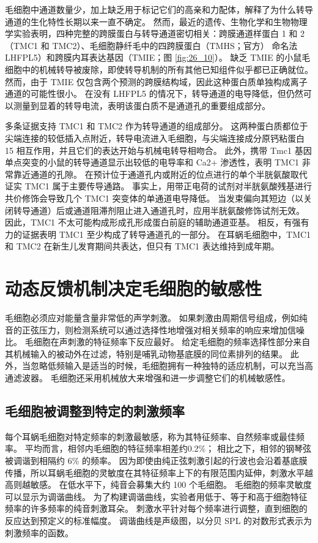 毛细胞中通道数量少，加上缺乏用于标记它们的高亲和力配体，解释了为什么转导通道的生化特性长期以来一直不确定。 
然而，最近的遗传、生物化学和生物物理学实验表明，四种完整的跨膜蛋白与转导通道密切相关：跨膜通道样蛋白 1 和 2（TMC1 和 TMC2）、毛细胞静纤毛中的四跨膜蛋白（TMHS；官方） 命名法 LHFPL5）和跨膜内耳表达基因（TMIE；图 \ref{fig:26_10}）。 
缺乏 TMIE 的小鼠毛细胞中的机械转导被废除，即使转导机制的所有其他已知组件似乎都已正确就位。 
然而，由于 TMIE 仅包含两个预测的跨膜结构域，因此这种蛋白质单独构成离子通道的可能性很小。 
在没有 LHFPL5 的情况下，转导通道的电导降低，但仍然可以测量到显着的转导电流，表明该蛋白质不是通道孔的重要组成部分。


多条证据支持 TMC1 和 TMC2 作为转导通道的组成部分。 
这两种蛋白质都位于尖端连接的较低插入点附近，转导电流进入毛细胞，与尖端连接成分原钙粘蛋白 15 相互作用，并且它们的表达开始与机械电转导相吻合。 
此外，携带 Tmc1 基因单点突变的小鼠的转导通道显示出较低的电导率和 Ca2+ 渗透性，表明 TMC1 非常靠近通道的孔隙。 
在预计位于通道孔内或附近的位点进行的单个半胱氨酸取代证实 TMC1 属于主要传导通路。 
事实上，用带正电荷的试剂对半胱氨酸残基进行共价修饰会导致几个 TMC1 突变体的单通道电导降低。 
当发束偏向其短边（以关闭转导通道）后或通道阻滞剂阻止进入通道孔时，应用半胱氨酸修饰试剂无效。 
因此，TMC1 不太可能构成形成孔形成蛋白前庭的辅助通道亚基。 
相反，有强有力的证据表明 TMC1 至少构成了转导通道孔的一部分。 
在耳蜗毛细胞中，TMC1 和 TMC2 在新生儿发育期间共表达，但只有 TMC1 表达维持到成年期。


\section{动态反馈机制决定毛细胞的敏感性}

毛细胞必须应对能量含量非常低的声学刺激。
如果刺激由周期信号组成，例如纯音的正弦压力，则检测系统可以通过选择性地增强对相关频率的响应来增加信噪比。
毛细胞在声刺激的特征频率下反应最好。 给定毛细胞的频率选择性部分来自其机械输入的被动外在过滤，特别是哺乳动物基底膜的同位素排列的结果。 此外，当忽略低频输入是适当的时候，毛细胞拥有一种独特的适应机制，可以充当高通滤波器。 毛细胞还采用机械放大来增强和进一步调整它们的机械敏感性。

\subsection{毛细胞被调整到特定的刺激频率}
每个耳蜗毛细胞对特定频率的刺激最敏感，称为其特征频率、自然频率或最佳频率。 平均而言，相邻内毛细胞的特征频率相差约0.2\%； 相比之下，相邻的钢琴弦被调谐到相隔约 6\% 的频率。 因为即使由纯正弦刺激引起的行波也会沿着基底膜传播，所以耳蜗毛细胞的灵敏度在其特征频率上下的有限范围内延伸，刺激水平越高则越敏感。 在低水平下，纯音会募集大约 100 个毛细胞。 毛细胞的频率灵敏度可以显示为调谐曲线。 为了构建调谐曲线，实验者用低于、等于和高于细胞特征频率的许多频率的纯音刺激耳朵。 刺激水平针对每个频率进行调整，直到细胞的反应达到预定义的标准幅度。 调谐曲线是声级图，以分贝 SPL 的对数形式表示为刺激频率的函数。

